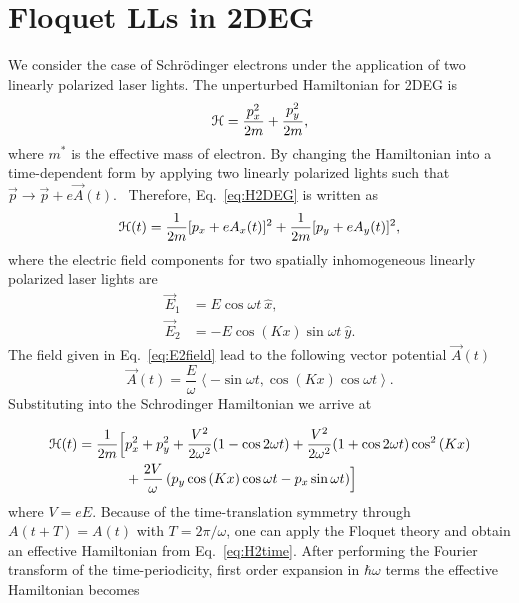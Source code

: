 \section{Floquet LLs in 2DEG}
We consider the case of Schr\"{o}dinger electrons under the application of two linearly polarized laser lights. The unperturbed Hamiltonian for 2DEG is%
\begin{equation}\label{eq:H2DEG}
\mathcal{H} =\frac{p_{x}^{2}}{2m}+\frac{p_{y}^{2}}{2m},
\end{equation}
where $m^{\ast}$ is the effective mass of electron. By changing the Hamiltonian into a time-dependent form by applying two linearly polarized lights
such that $\vec{p}\rightarrow \vec{p}+e\vec{A}(t)$. \ Therefore, Eq.~\eqref{eq:H2DEG} is written as%
\begin{equation}\label{eq:H2time}
\mathcal{H}(t)=\frac{1}{2m}[p_{x}+eA_{x}(t)]^{2}+\frac{1}{2m}[p_{y} +eA_{y}(t)]^{2},
\end{equation}
where the electric field components for two spatially inhomogeneous linearly polarized laser lights are
\begin{align} \label{eq:E2field}
  \vec{E}_{1} &= E \cos{\omega t}\ \hat{x}, \nonumber \\
  \vec{E}_{2} &= -E\cos{(K x)} \sin{\omega t}\ \hat{y}.
\end{align}%
The field given in Eq.~\eqref{eq:E2field} lead to the following vector potential $\vec{A}(t)$
\begin{equation}\label{eq:A2deg}
  \vec{A}(t)= \dfrac{E}{\omega} \left\langle -\sin \omega t, \cos{(Kx)} \cos{\omega t} \right\rangle.
\end{equation}%
Substituting into the Schrodinger Hamiltonian we arrive at

\begin{align}\label{eq:H2time}
  \mathcal{H}(t) = \dfrac{1}{2m} \Bigl[ &p_x^2 + p_y^2 + \dfrac{V^2}{2\omega^2}(1-\cos{2\omega t}) + \dfrac{V^2}{2\omega^2}(1+\cos{2\omega t}) \cos^2{(Kx)} \nonumber \\
  &+\dfrac{2V}{\omega} \left(p_y \cos{(Kx)}\cos{\omega t} -  p_x \sin{\omega t}\right) \Bigr]
\end{align}
where $V=eE$.
Because of the time-translation symmetry through $A(t+T) = A(t)$ with $T = 2\pi/\omega$, one can apply the Floquet theory \cite{AEE, MBL, supp} and obtain an effective Hamiltonian from Eq.~\eqref{eq:H2time}. After performing the Fourier transform of the time-periodicity, first order expansion in $\hbar \omega$ terms the effective Hamiltonian becomes

